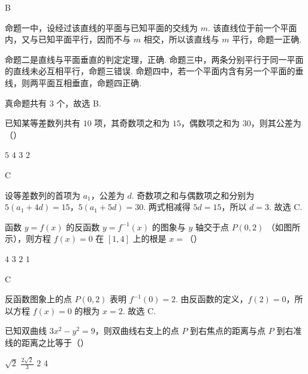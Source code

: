 \begin{answer}
B
\end{answer}

\begin{solution}
命题一中，设经过该直线的平面与已知平面的交线为 \(m\). 该直线位于前一个平面内，又与已知平面平行，因而不与 \(m\) 相交，所以该直线与 \(m\) 平行，命题一正确.

命题二是直线与平面垂直的判定定理，正确. 命题三中，两条分别平行于同一平面的直线未必互相平行，命题三错误. 命题四中，若一个平面内含有另一个平面的垂线，则两平面互相垂直，命题四正确.

真命题共有 \(3\) 个，故选 B.
\end{solution}

\begin{problem}
已知某等差数列共有 \(10\) 项，其奇数项之和为 \(15\)，偶数项之和为 \(30\)，则其公差为（\quad）

\choices
    {\(5\)}
    {\(4\)}
    {\(3\)}
    {\(2\)}
\end{problem}

\begin{answer}
C
\end{answer}

\begin{solution}
设等差数列的首项为 \(a_1\)，公差为 \(d\). 奇数项之和与偶数项之和分别为
\(5(a_1+4d)=15\)，\(5(a_1+5d)=30\).
两式相减得 \(5d=15\)，所以 \(d=3\). 故选 C.
\end{solution}

\begin{problem}
函数 \( y = f(x) \) 的反函数 \( y = f^{-1}(x) \) 的图象与 \( y \) 轴交于点 \( P(0,2) \) （如图所示），则方程 \( f(x) = 0 \) 在 \([1,4]\) 上的根是 \( x = \)（\quad）


\choices
    {\(4\)}
    {\(3\)}
    {\(2\)}
    {\(1\)}
\end{problem}

\begin{answer}
C
\end{answer}

\begin{solution}
反函数图象上的点 \(P(0,2)\) 表明 \(f^{-1}(0)=2\). 由反函数的定义，\(f(2)=0\)，所以方程 \(f(x)=0\) 的根为 \(x=2\). 故选 C.
\end{solution}

\begin{problem}
已知双曲线 \(3x^{2} - y^{2} = 9\)，则双曲线右支上的点 \(P\) 到右焦点的距离与点 \(P\) 到右准线的距离之比等于（\quad）

\choices
    {\(\sqrt{2}\)}
    {\(\frac{2\sqrt{2}}{3}\)}
    {\(2\)}
    {\(4\)}
\end{problem}

